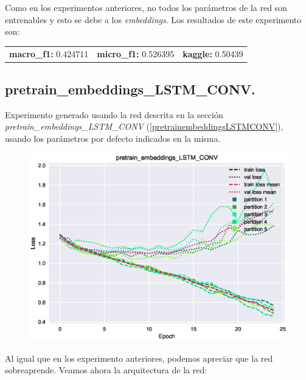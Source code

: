 \documentclass[11pt]{article}
\begin{document}
Como en los experimentos anteriores, no todos los parámetros de la red son entrenables y esto se debe a los \textit{embeddings}. Los resultados de este experimento son: 

\begin{table}[H]
\begin{tabular}{c|c|c}
\textbf{macro\_f1:} 0.424711 & \textbf{micro\_f1:} 0.526395 & \textbf{kaggle:} 0.50439
\end{tabular}
\end{table}

\subsection{pretrain\_embeddings\_LSTM\_CONV.} \label{exp_pretrainembeddingsLSTMCONV}

Experimento generado usando la red descrita en la sección \textit{pretrain\_embeddings\_LSTM\_CONV} (\ref{pretrainembeddingsLSTMCONV}), usando los parámetros por defecto indicados en la misma.

\begin{figure}[H]
\includegraphics[width=\linewidth]{images/loss/pretrain_embeddings_LSTM_CONV-1554205954.eps}
\end{figure}

Al igual que en los experimento anteriores, podemos apreciar que la red sobreaprende. Veamos ahora la arquitectura de la red:
\end{document}
